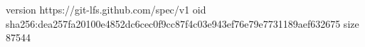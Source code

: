 version https://git-lfs.github.com/spec/v1
oid sha256:dea257fa20100e4852dc6cec0f9cc87f4c03e943ef76e79e7731189aef632675
size 87544
